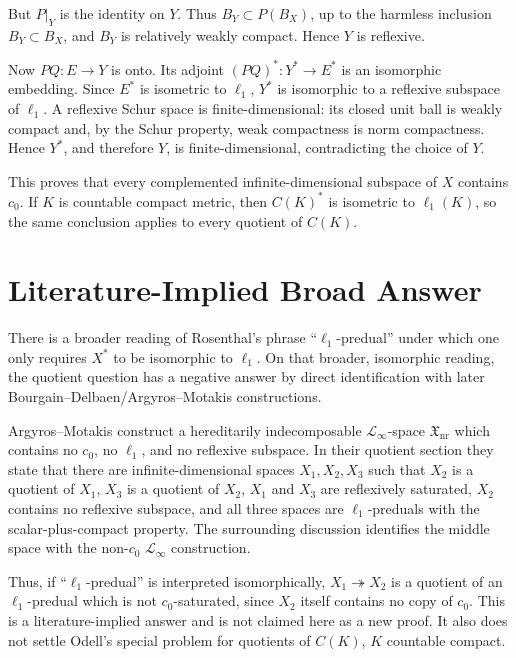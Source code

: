 \documentclass[11pt]{article}
\begin{document}
But \(P|_Y\) is the identity on \(Y\).  Thus \(B_Y\subset P(B_X)\), up to the harmless inclusion \(B_Y\subset B_X\), and \(B_Y\) is relatively weakly compact.  Hence \(Y\) is reflexive.

Now \(P Q:E\to Y\) is onto.  Its adjoint \((PQ)^*:Y^*\to E^*\) is an isomorphic embedding.  Since \(E^*\) is isometric to \(\ell_1\), \(Y^*\) is isomorphic to a reflexive subspace of \(\ell_1\).  A reflexive Schur space is finite-dimensional: its closed unit ball is weakly compact and, by the Schur property, weak compactness is norm compactness.  Hence \(Y^*\), and therefore \(Y\), is finite-dimensional, contradicting the choice of \(Y\).

This proves that every complemented infinite-dimensional subspace of \(X\) contains \(c_0\).  If \(K\) is countable compact metric, then \(C(K)^*\) is isometric to \(\ell_1(K)\), so the same conclusion applies to every quotient of \(C(K)\).

\section*{Literature-Implied Broad Answer}

There is a broader reading of Rosenthal's phrase ``\(\ell_1\)-predual'' under which one only requires \(X^*\) to be isomorphic to \(\ell_1\).  On that broader, isomorphic reading, the quotient question has a negative answer by direct identification with later Bourgain--Delbaen/Argyros--Motakis constructions.

Argyros--Motakis \cite{AM} construct a hereditarily indecomposable \(\mathscr L_\infty\)-space \(\mathfrak X_{\mathrm{nr}}\) which contains no \(c_0\), no \(\ell_1\), and no reflexive subspace.  In their quotient section they state that there are infinite-dimensional spaces \(X_1,X_2,X_3\) such that \(X_2\) is a quotient of \(X_1\), \(X_3\) is a quotient of \(X_2\), \(X_1\) and \(X_3\) are reflexively saturated, \(X_2\) contains no reflexive subspace, and all three spaces are \(\ell_1\)-preduals with the scalar-plus-compact property.  The surrounding discussion identifies the middle space with the non-\(c_0\) \(\mathscr L_\infty\) construction.

Thus, if ``\(\ell_1\)-predual'' is interpreted isomorphically, \(X_1\twoheadrightarrow X_2\) is a quotient of an \(\ell_1\)-predual which is not \(c_0\)-saturated, since \(X_2\) itself contains no copy of \(c_0\).  This is a literature-implied answer and is not claimed here as a new proof.  It also does not settle Odell's special problem for quotients of \(C(K)\), \(K\) countable compact.
\end{document}
